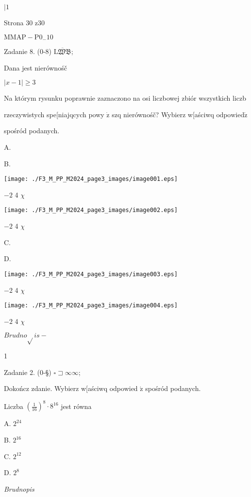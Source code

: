 \documentclass[a4paper,12pt]{article}
\begin{document}
$| 1$

Strona 30 z30

$\mathrm{M}\mathrm{M}\mathrm{A}\mathrm{P}-\mathrm{P}0_{-}10$





Zadanie 8. (0-8) $\overline{\mathrm{L}\mathfrak{W}\mathfrak{B}}$;

Dana jest nierównośč

$|x-1|\geq 3$

Na którym rysunku poprawnie zaznaczono na osi liczbowej zbiór wszystkich liczb

rzeczywistych spe[niajqcych powy $\dot{\mathrm{z}}$ szq nierównośč? Wybierz w[aściwq $\mathrm{o}\mathrm{d}\mathrm{p}\mathrm{o}\mathrm{w}\mathrm{i}\mathrm{e}\mathrm{d}\acute{\mathrm{z}}$

spośród podanych.

A.

B.
\begin{center}
\texttt{[image: ./F3\_M\_PP\_M2024\_page3\_images/image001.eps]}
\end{center}
$-2$  4  $\chi$
\begin{center}
\texttt{[image: ./F3\_M\_PP\_M2024\_page3\_images/image002.eps]}
\end{center}
$-2$  4  $\chi$

C.

D.
\begin{center}
\texttt{[image: ./F3\_M\_PP\_M2024\_page3\_images/image003.eps]}
\end{center}
$-2$  4  $\chi$
\begin{center}
\texttt{[image: ./F3\_M\_PP\_M2024\_page3\_images/image004.eps]}
\end{center}
$-2$  4  $\chi$

$Brudno\sqrt{}is -$

1

Zadanie 2. (0-\S) $\square \sqsupset\infty\infty$;

Dokończ zdanie. Wybierz w[aściwq odpowied $\acute{\mathrm{z}}$ spośród podanych.

Liczba $(\displaystyle \frac{1}{16})^{8}\cdot 8^{16}$ jest równa

A. $2^{24}$

B. $2^{16}$

C. $2^{12}$

D. $2^{8}$

{\it Brudnopis}
\end{document}
